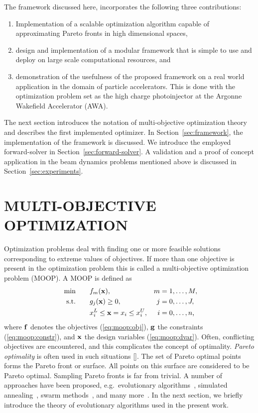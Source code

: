 \documentclass[preprint,linenumbers,amsmath,amssymb,aps,prstab]{revtex4-1}%
\begin{document}
The framework discussed here, incorporates the following three contributions:
%
\begin{enumerate}
  \item Implementation of a scalable optimization algorithm capable of
        approximating Pareto fronts in high dimensional spaces,
  \item design and implementation of a modular framework that is simple to use
        and deploy on large scale computational resources, and
  \item demonstration of the usefulness of the proposed framework on a real world
        application in the domain of particle accelerators. This is done
        with the optimization problem set as 
        the high charge photoinjector at the Argonne Wakefield Accelerator (AWA). 
\end{enumerate}

The next section introduces the notation of multi-objective optimization
theory and describes the first implemented optimizer.
In Section~\ref{sec:framework}, the implementation of the framework is discussed.
We introduce the employed forward-solver in Section~\ref{sec:forward-solver}.
A validation and a proof of concept application in the beam dynamics problems 
mentioned above is discussed in Section~\ref{sec:experiments}.


\section{MULTI-OBJECTIVE OPTIMIZATION} \label{sec:optimization}

Optimization problems deal with finding one or more feasible solutions
  corresponding to extreme values of objectives.
If more than one objective is present in the optimization problem this is called
  a multi-objective optimization problem (MOOP).
A MOOP is defined as
%
\begin{align}
  \text{ min} \quad & \quad f_m({\bf x}), ~& m &= 1, \dots, M, \label{eq:moop:obj}\\
  \text{s.t.} \quad & \quad g_j({\bf x}) \geq 0, & j &= 0, \dots, J,
  \label{eq:moop:constr}\\
  \quad & \quad  x_i^L \leq {\bf x}=x_i \leq x_i^U,& i &=0, \dots, n
  \label{eq:moop:dvar} \text{,}
\end{align}
%
where $\bf f$ denotes the objectives (\ref{eq:moop:obj}),
  $\bf g$ the constraints (\ref{eq:moop:constr}),
  and $\bf x$ the design variables (\ref{eq:moop:dvar}).
Often, conflicting objectives are encountered, and this complicates the concept of
  optimality. \textit{Pareto optimality} is often used in such situations [].
The set of Pareto optimal points forms the Pareto front or
  surface.
All points on this surface are considered to be Pareto optimal.
Sampling Pareto fronts is far from trivial.
A number of approaches have been proposed,
  e.g.\ evolutionary algorithms~\cite{deb:09},
  simulated annealing~\cite{kigv:83},
  swarm methods~\cite{keeb:95},
  and many more~\cite{domc:96,cati:02,kara:05,hoss:09}.
In the next section, we briefly introduce the theory of evolutionary algorithms
  used in the present work.
\end{document}
